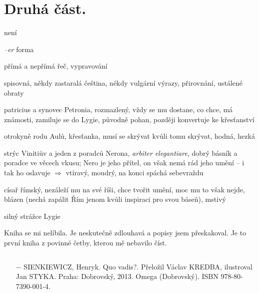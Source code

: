 \documentclass{article}
\begin{document}
\section{Druhá část.}
\begin{description}
    \setlength\itemsep{0.15em}
    \item[vypravěč:] není
    \item[vyprávěcí způsoby:] \textit{--er} forma
    \item[typy promluv:] přímá a nepřímá řeč, vypravování
    \item[jazyková stránka:] spisovná, někdy zastaralá čeština, někdy vulgární výrazy, přirovnání, ustálené obraty
    \item[postavy:]
        \begin{description}
            \setlength\itemsep{0.15em}
            \item[Vinitius,] patricius a synovec Petronia, rozmazlený, vždy se mu dostane, co chce, má známosti, zamiluje se do Lygie, původně pohan, později konvertuje ke křesťanství
            \item[Lygie,] otrokyně rodu Aulů, křesťanka, musí se skrývat kvůli tomu skrývat, hodná, hezká
            \item[Petronius,] strýc Vinitiův a jeden z poradců Nerona, \textit{arbiter elegantiare}, dobrý básník a poradce ve věcech vkusu; Nero je jeho přítel, on však nemá rád jeho umění -- i tak ho oslavuje $\Rightarrow$ vtíravý, moudrý, na konci spáchá sebevraždu
            \item[Nero,] císař římský, nezáleží mu na své říši, chce tvořit umění, moc mu to však nejde, blázen (nechá zapálit Řím jenom kvůli inspiraci pro svou báseň), mstivý
            \item[Ursus,] silný strážce Lygie
        \end{description}
    \item[názor:] Kniha se mi nelíbila. Je neskutečně zdlouhavá a popisy jsem přeskakoval. Je to první kniha z povinné četby, kterou mě nebavilo číst.
    \item[zdroje:] $ $
    \begin{itemize}
        \setlength\itemsep{0em}
        \item[$-$] SIENKIEWICZ, Henryk. Quo vadis?. Přeložil Václav KREDBA, ilustroval Jan STYKA. Praha: Dobrovský, 2013. Omega (Dobrovský). ISBN 978-80-7390-001-4.
    \end{itemize}
\end{description}
\end{document}
